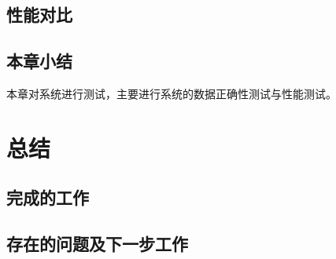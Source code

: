 \documentclass{zjutthesis}
\begin{document}
\section{性能对比} %

\section{本章小结}
本章对系统进行测试，主要进行系统的数据正确性测试与性能测试。

\chapter{总结}
\section{完成的工作}

\section{存在的问题及下一步工作}

\backmatter


\nocite{*}                                   %


\appendix

\end{document}
